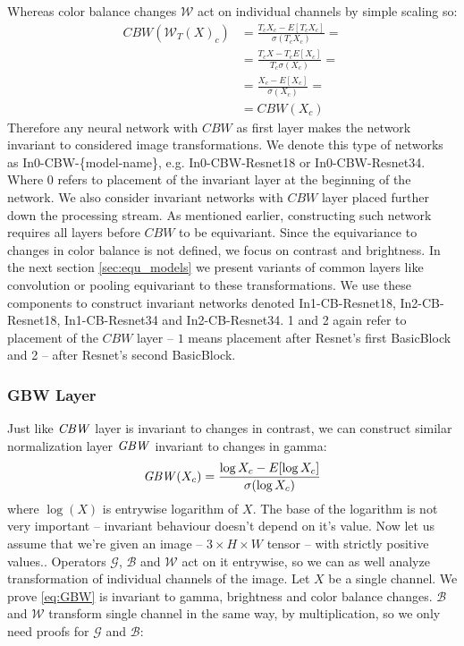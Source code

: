 Whereas color balance changes $\mathcal{W}$ act on individual channels by simple
scaling so:
\begin{align*}
    \mathit{CBW}(\mathcal{W}_T(X)_c) &=
    \frac{T_cX_c - E\left[T_cX_c\right]}{\sigma(T_cX_c)} = \\
    &= \frac{T_cX-T_cE[X_c]}{T_c\sigma(X_c)} = \\
    &= \frac{X_c-E[X_c]}{\sigma(X_c)} = \\
    &= \mathit{CBW}(X_c)
\end{align*}
Therefore any neural network with $\mathit{CBW}$ as first layer
makes the network invariant to considered image transformations.
We denote this type of networks as In0-CBW-\{model-name\}, e.g. In0-CBW-Resnet18 or
In0-CBW-Resnet34. Where 0 refers to placement of the invariant layer at the
beginning of the network. We also consider invariant networks with $\mathit{CBW}$
layer placed further down the processing stream. As mentioned earlier,
constructing such network requires all layers before $\mathit{CBW}$ to be
equivariant. Since the equivariance to changes in color balance is not defined,
we focus on contrast and brightness. In the next section \ref{sec:equ_models} we
present variants of common layers like convolution or pooling equivariant to
these transformations. We use these components to construct invariant networks
denoted In1-CB-Resnet18, In2-CB-Resnet18, In1-CB-Resnet34 and In2-CB-Resnet34. 1 and 2
again refer to placement of the $\mathit{CBW}$ layer -- $1$ means placement
after Resnet's first BasicBlock and 2 -- after Resnet's second
BasicBlock.

\subsubsection{GBW Layer}
Just like $\mathit{CBW}$ layer is invariant to changes in contrast,
we can construct similar normalization layer $\mathit{GBW}$ invariant to changes in
gamma:
\begin{equation}
    \mathit{GBW}(X_c) = \frac{\log{X_c}-E[\log{X_c}]}{\sigma(\log{X_c})}
    \label{eq:GBW}
\end{equation}
where $\log(X)$ is entrywise logarithm of $X$. The base of the
logarithm is not very important -- invariant behaviour doesn't depend on it's value.
Now let us assume that we're given an image -- $3\times H \times W$ tensor --
with strictly positive values..
Operators $\mathcal{G}$, $\mathcal{B}$ and $\mathcal{W}$ act on it entrywise, so
we can as well analyze transformation of individual channels of the image.
Let $X$ be a single channel.
We prove \ref{eq:GBW} is invariant to gamma, brightness and color balance
changes. $\mathcal{B}$ and $\mathcal{W}$ transform single channel in the same
way, by multiplication,
so we only need proofs for $\mathcal{G}$ and $\mathcal{B}$:

